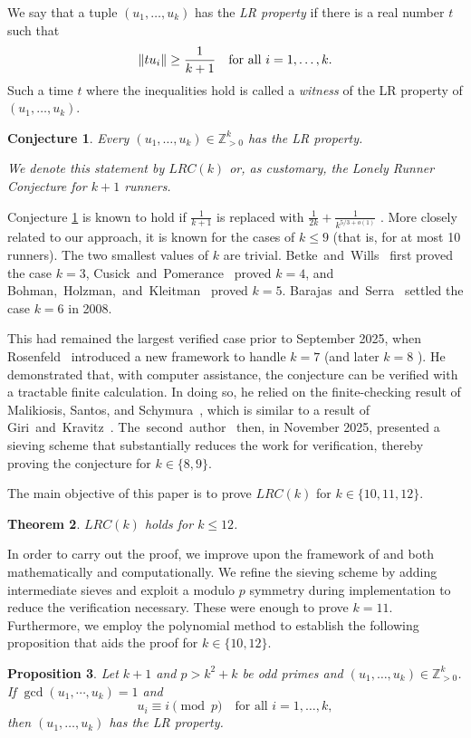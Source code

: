 \documentclass[11pt]{amsart}
\DeclarePairedDelimiter\norm{\lVert}{\rVert}
\newcommand{\Z}{\mathbb{Z}}
\newtheorem{theorem}{Theorem}[section]
\newtheorem{proposition}[theorem]{Proposition}
\newtheorem{conjecture}[theorem]{Conjecture}
\theoremstyle{definition}
\theoremstyle{remark}
\begin{document}
We say that a tuple $(u_1, \dots, u_k)$ has the \emph{LR property} if there is a real number $t$ such that 
\[\norm{tu_i}\geq\frac{1}{k+1} \quad \text{for all } i = 1,\dots,k.\]
Such a time $t$ where the inequalities hold is called a \emph{witness} of the LR property of $(u_1, \dots,u_k)$.

\begin{conjecture} \label{lonelyconjred}
  Every $(u_1,\ldots,u_k)\in\Z_{>0}^k$ has the \emph{LR property}.

  We denote this statement by $LRC(k)$ or, as customary, the Lonely Runner Conjecture for $k+1$ runners.
\end{conjecture}

Conjecture \ref{lonelyconjred} is known to hold if $\frac{1}{k+1}$ is replaced with
$\frac{1}{2k}+\frac{1}{k^{5/3+o(1)}}$ \cite{bedert2025riesz}.
More closely related to our approach, it is known for the cases of $k\leq9$ (that is, for at most 10 runners).
The two smallest values of $k$ are trivial. 
Betke~and~Wills~\cite{fourrunners} first proved the case $k=3$, Cusick~and~Pomerance~\cite{cusick1984view} proved $k=4$, 
and Bohman,~Holzman,~and~Kleitman~\cite{Bohman} proved $k=5$. Barajas~and~Serra~\cite{barajas_lonely_2008} 
settled the case $k=6$ in 2008.

This had remained the largest verified case prior to September 2025, when Rosenfeld~\cite{Rosenfeld} introduced a new 
framework to handle $k=7$ (and later $k=8$ \cite{rosenfeld2025lonely2}). 
He demonstrated that, with computer assistance, the conjecture can be verified with a tractable finite calculation.
In doing so, he relied on the finite-checking result of Malikiosis, Santos, and Schymura~\cite{Malikiosis}, 
which is similar to a result of Giri~and~Kravitz~\cite{giri_structure_2026}. 
The~second~author~\cite{Trakulthongchai} then, in November 2025, 
presented a sieving scheme that substantially reduces the work for verification, thereby proving the conjecture for $k\in\{8,9\}$. 

The main objective of this paper is to prove $LRC(k)$ for $k\in\{10,11,12\}$.
\begin{theorem} \label{thm:main}
    $LRC(k)$ holds for $k\leq12$.
\end{theorem}

In order to carry out the proof, we improve upon the framework of \cite{Rosenfeld} and \cite{Trakulthongchai}
both mathematically and computationally. We refine the sieving scheme by adding intermediate sieves and exploit a modulo
$p$ symmetry during implementation to reduce the verification necessary. These were enough to prove $k=11$. 
Furthermore, we employ the polynomial method to establish the following proposition that aids the proof for $k\in\{10,12\}$.
\begin{proposition} \label{prop:onetokintro}
    Let $k+1$ and $p > k^2 + k$ be odd primes and $(u_1,\ldots,u_k)\in\Z_{>0}^k$.
    If $\gcd(u_1,\cdots,u_k)=1$ and 
    \[u_i\equiv i\pmod{p} \quad \text{for all } i = 1,\dots,k,\] 
    then $(u_1,\ldots,u_k)$ has the LR property.
\end{proposition}
\end{document}
